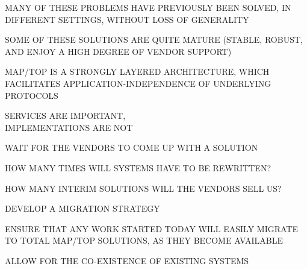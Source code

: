 \begin{bwslide}
\vskip-0.5in
\end	{bwslide}

\begin{bwslide}

\begin	{nrtc}
\item	MANY OF THESE PROBLEMS HAVE PREVIOUSLY BEEN SOLVED, IN\\ DIFFERENT
	SETTINGS, WITHOUT LOSS OF GENERALITY
	\begin	{nrtc}
	\item	SOME OF THESE SOLUTIONS ARE QUITE MATURE
		(STABLE, ROBUST, AND ENJOY A HIGH DEGREE OF VENDOR SUPPORT)
	\end	{nrtc}
\item	MAP/TOP IS A STRONGLY LAYERED ARCHITECTURE, WHICH FACILITATES
	APPLICATION-INDEPENDENCE OF UNDERLYING PROTOCOLS
	\begin	{nrtc}
	\item	SERVICES ARE IMPORTANT,\\ IMPLEMENTATIONS ARE NOT
	\end	{nrtc}
\end	{nrtc}
\end	{bwslide}

\begin{bwslide}

\begin	{nrtc}
\item	WAIT FOR THE VENDORS TO COME UP WITH A SOLUTION
	\begin	{nrtc}
	\item	HOW MANY TIMES WILL SYSTEMS HAVE TO BE REWRITTEN?
	\item	HOW MANY INTERIM SOLUTIONS WILL THE VENDORS SELL US?
	\end	{nrtc}
\item	DEVELOP A MIGRATION STRATEGY
	\begin	{nrtc}
	\item 	ENSURE THAT ANY WORK STARTED TODAY WILL EASILY MIGRATE TO
		TOTAL MAP/TOP SOLUTIONS, AS THEY BECOME AVAILABLE
	\item	ALLOW FOR THE CO-EXISTENCE OF EXISTING SYSTEMS
	\end	{nrtc}
\end	{nrtc}
\end	{bwslide}

